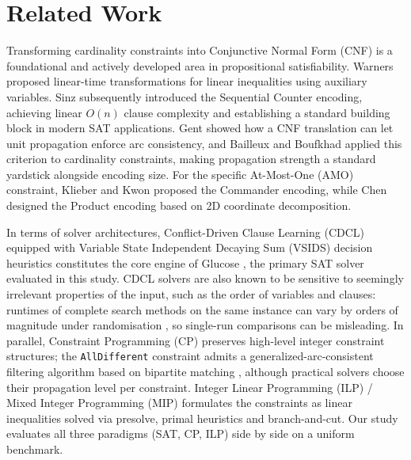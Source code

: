\documentclass[a4paper,fleqn]{cas-sc}
\begin{document}
\section{Related Work}
Transforming cardinality constraints into Conjunctive Normal Form (CNF) is a foundational and actively developed area in propositional satisfiability. Warners \cite{warners1998nonlinear} proposed linear-time transformations for linear inequalities using auxiliary variables. Sinz \cite{sinz2005towards} subsequently introduced the Sequential Counter encoding, achieving linear $O(n)$ clause complexity and establishing a standard building block in modern SAT applications. Gent \cite{gent2002arc} showed how a CNF translation can let unit propagation enforce arc consistency, and Bailleux and Boufkhad \cite{bailleux2003efficient} applied this criterion to cardinality constraints, making propagation strength a standard yardstick alongside encoding size. For the specific At-Most-One (AMO) constraint, Klieber and Kwon \cite{klieber2007efficient} proposed the Commander encoding, while Chen \cite{chen2010new} designed the Product encoding based on 2D coordinate decomposition.

In terms of solver architectures, Conflict-Driven Clause Learning (CDCL) equipped with Variable State Independent Decaying Sum (VSIDS) decision heuristics \cite{marques2008conflict} constitutes the core engine of Glucose \cite{audemard2009predicting}, the primary SAT solver evaluated in this study. CDCL solvers are also known to be sensitive to seemingly irrelevant properties of the input, such as the order of variables and clauses: runtimes of complete search methods on the same instance can vary by orders of magnitude under randomisation \cite{gomes2000heavy}, so single-run comparisons can be misleading. In parallel, Constraint Programming (CP) \cite{rossi2006handbook} preserves high-level integer constraint structures; the \texttt{AllDifferent} constraint admits a generalized-arc-consistent filtering algorithm based on bipartite matching \cite{regin1994filtering}, although practical solvers choose their propagation level per constraint. Integer Linear Programming (ILP) / Mixed Integer Programming (MIP) \cite{bertsimas1997introduction} formulates the constraints as linear inequalities solved via presolve, primal heuristics and branch-and-cut. Our study evaluates all three paradigms (SAT, CP, ILP) side by side on a uniform benchmark.
\end{document}
